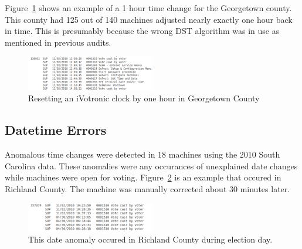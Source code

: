 Figure~\ref{fig:Georgetown} shows an example of a 1 hour time change for the
Georgetown county.  This county had 125 out of 140 machines adjusted nearly
exactly one hour back in time.  This is presumably because the wrong DST
algorithm was in use as mentioned in previous audits.~\cite{Buell2011}
\begin{figure}[h!]
  \caption{Resetting an iVotronic clock by one hour in Georgetown
County}
  \label{fig:Georgetown}
  \centering
    \includegraphics[width=0.5\textwidth]{datefig1.png}
\end{figure}

\subsection{Datetime Errors}
Anomalous time changes were detected in 18 machines using the 2010 South
Carolina data.  These anomalies were any occurances of unexplained date
changes while machines were open for voting. Figure~\ref{fig:Richland}
is an example that occured in Richland County.  The machine was manually
corrected about 30 minutes later.
\begin{figure}[h!]
  \caption{This date anomaly occured in Richland County during election day.}
  \label{fig:Richland}
  \centering
    \includegraphics[width=0.5\textwidth]{datefig2.png}
\end{figure}


